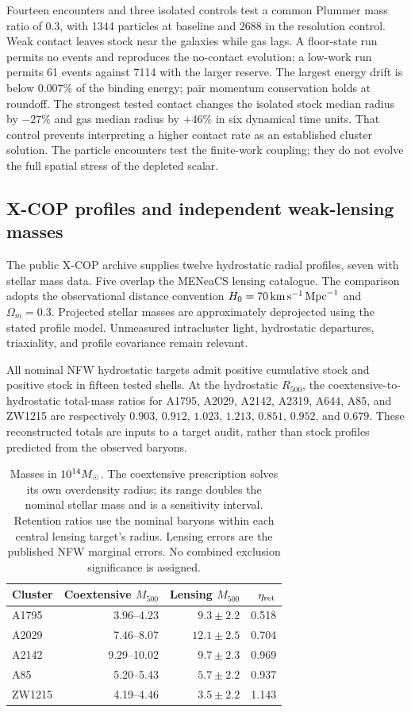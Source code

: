 Fourteen encounters and three isolated controls test a common Plummer
mass ratio of 0.3, with 1344 particles at baseline and 2688 in the
resolution control. Weak contact leaves stock near the galaxies while
gas lags. A floor-state run permits no events and reproduces the
no-contact evolution; a low-work run permits 61 events against 7114
with the larger reserve. The largest energy drift is below 0.007\%
of the binding energy; pair momentum conservation holds at roundoff.
The strongest tested contact changes the isolated stock median radius
by $-27\%$ and gas median radius by $+46\%$ in six dynamical time units.
That control prevents interpreting a higher contact rate as an established
cluster solution. The particle encounters test the finite-work coupling;
they do not evolve the full spatial stress of the depleted scalar.

\subsection{X-COP profiles and independent weak-lensing masses}
The public X-COP archive supplies twelve hydrostatic radial profiles,
seven with stellar mass data. Five overlap the MENeaCS lensing catalogue.
The comparison adopts the observational distance convention
$H_0=70\,\mathrm{km\,s^{-1}}\,\mathrm{Mpc}^{-1}$ and $\Omega_m=0.3$.
Projected stellar masses are approximately deprojected using the stated
profile model. Unmeasured intracluster light, hydrostatic departures,
triaxiality, and profile covariance remain relevant.
\cite{xcopnew,herbonnetnew}

All nominal NFW hydrostatic targets admit positive cumulative stock and
positive stock in fifteen tested shells. At the hydrostatic $R_{500}$,
the coextensive-to-hydrostatic total-mass ratios for A1795, A2029, A2142,
A2319, A644, A85, and ZW1215 are respectively
$0.903$, $0.912$, $1.023$, $1.213$, $0.851$, $0.952$, and $0.679$.
These reconstructed totals are inputs to a target audit, rather than
stock profiles predicted from the observed baryons.

\begin{table}[htbp]
\centering\small
\begin{tabular}{lrrr}
\toprule
Cluster & Coextensive $M_{500}$ & Lensing $M_{500}$ & $\eta_{\rm ret}$\\
\midrule
A1795 & 3.96--4.23 & $9.3\pm2.2$ & 0.518\\
A2029 & 7.46--8.07 & $12.1\pm2.5$ & 0.704\\
A2142 & 9.29--10.02 & $9.7\pm2.3$ & 0.969\\
A85 & 5.20--5.43 & $5.7\pm2.2$ & 0.937\\
ZW1215 & 4.19--4.46 & $3.5\pm2.2$ & 1.143\\
\bottomrule
\end{tabular}
\caption{Masses in $10^{14}M_\odot$. The coextensive prescription solves
its own overdensity radius; its range doubles the nominal stellar mass
and is a sensitivity interval. Retention ratios use the nominal baryons
within each central lensing target's radius. Lensing errors are the
published NFW marginal errors. No combined exclusion significance is
assigned.}
\end{table}

